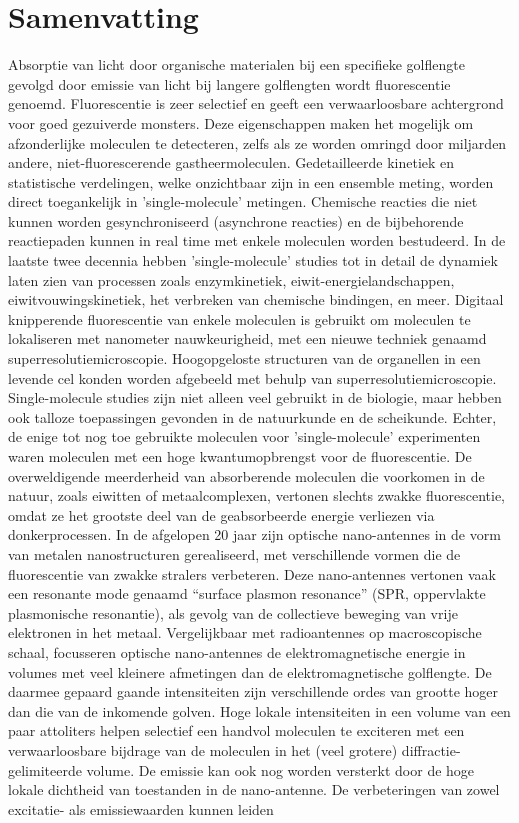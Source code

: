\chapter*{Samenvatting}
\label{ch:Samenvatting}

Absorptie van licht door organische materialen bij een specifieke golflengte gevolgd door emissie
van licht bij langere golflengten wordt fluorescentie genoemd. Fluorescentie is zeer selectief en geeft een verwaarloosbare achtergrond voor goed gezuiverde monsters. Deze eigenschappen maken het mogelijk om afzonderlijke moleculen te detecteren, zelfs als ze worden omringd door miljarden andere, niet-fluorescerende gastheermoleculen. Gedetailleerde kinetiek en statistische verdelingen, welke onzichtbaar zijn in een ensemble meting, worden direct toegankelijk in ’single-molecule’ metingen. Chemische reacties die niet kunnen worden gesynchroniseerd (asynchrone reacties) en de bijbehorende reactiepaden kunnen in real time met enkele moleculen worden bestudeerd. In de laatste twee decennia hebben ’single-molecule’ studies tot in detail de dynamiek laten zien van processen zoals enzymkinetiek, eiwit-energielandschappen, eiwitvouwingskinetiek, het verbreken van chemische bindingen, en meer. Digitaal knipperende fluorescentie van enkele moleculen is gebruikt om moleculen te lokaliseren met nanometer nauwkeurigheid, met een nieuwe techniek genaamd superresolutiemicroscopie. Hoogopgeloste  structuren van de organellen in een levende cel konden worden afgebeeld met behulp van superresolutiemicroscopie. Single-molecule studies zijn niet alleen veel gebruikt in de biologie, maar hebben ook talloze toepassingen gevonden in de natuurkunde en de scheikunde. Echter, de enige tot nog toe gebruikte moleculen voor ’single-molecule’ experimenten waren moleculen met een hoge kwantumopbrengst voor de fluorescentie. De overweldigende meerderheid van absorberende moleculen die voorkomen in de natuur, zoals eiwitten of metaalcomplexen, vertonen slechts zwakke fluorescentie, omdat ze het grootste deel van de geabsorbeerde energie verliezen via donkerprocessen. In de afgelopen 20 jaar zijn optische nano-antennes in de vorm van metalen nanostructuren gerealiseerd, met verschillende vormen die de fluorescentie van zwakke stralers verbeteren. Deze nano-antennes vertonen vaak een resonante mode genaamd ``surface plasmon resonance'' (SPR, oppervlakte plasmonische resonantie), als gevolg van de collectieve beweging van vrije elektronen in het metaal. Vergelijkbaar met radioantennes op macroscopische schaal, focusseren optische nano-antennes de elektromagnetische energie in volumes met veel kleinere afmetingen dan de elektromagnetische golflengte. De daarmee gepaard gaande intensiteiten zijn verschillende ordes van grootte hoger dan die van de inkomende golven. Hoge lokale intensiteiten in een volume van een paar attoliters helpen selectief een handvol moleculen te exciteren met een verwaarloosbare bijdrage van de moleculen in het (veel grotere) diffractie-gelimiteerde volume. De emissie kan ook nog worden versterkt door de hoge lokale dichtheid van toestanden in de nano-antenne. De verbeteringen van zowel excitatie- als emissiewaarden kunnen leiden 